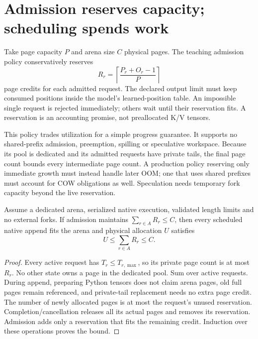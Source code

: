 \section{Admission reserves capacity; scheduling spends work}
\label{evod37:admission}
Take page capacity $P$ and arena size $C$ physical pages. The teaching
admission policy conservatively reserves
\[
 R_r=\left\lceil\frac{P_r+O_r-1}{P}\right\rceil
\]
page credits for each admitted request. The declared output limit must keep
consumed positions inside the model's learned-position table. An impossible
single request is rejected immediately; others wait until their reservation
fits. A reservation is an accounting promise, not preallocated K/V tensors.


This policy trades utilization for a simple progress guarantee. It supports
no shared-prefix admission, preemption, spilling or speculative workspace.
Because its pool is dedicated and its admitted requests have private tails,
the final page count bounds every intermediate page count. A production
policy reserving only immediate growth must instead handle later OOM;
one that uses shared prefixes must account for COW obligations as well.
Speculation needs temporary fork capacity beyond the live reservation.

\begin{proposition}
Assume a dedicated arena, serialized native execution, validated length
limits and no external forks. If admission maintains
$\sum_{r\in A}R_r\le C$, then every scheduled native append fits the arena
and physical allocation $U$ satisfies
\[
 U\le\sum_{r\in A}R_r\le C.
\]
\end{proposition}
\begin{proof}
Every active request has $T_r\le T_{r,\max}$, so its private page count
is at most $R_r$. No other state owns a page in the dedicated pool.
Sum over active requests. During append, preparing Python tensors does not
claim arena pages, old full pages remain referenced, and private-tail
replacement needs no extra page credit. The number of newly allocated pages
is at most the request's unused reservation. Completion/cancellation releases
all its actual pages and removes its reservation. Admission adds only a
reservation that fits the remaining credit. Induction over these operations
proves the bound.
\end{proof}

